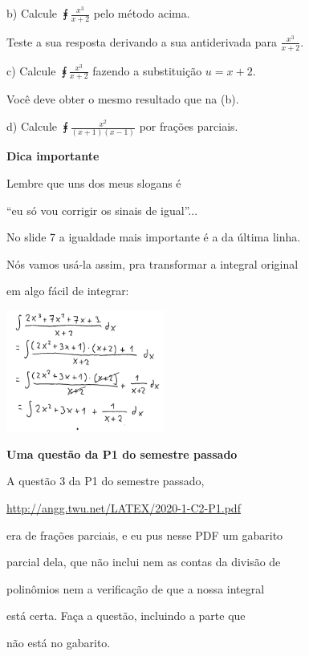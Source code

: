 \documentclass[oneside,12pt]{article}
\begin{document}
b) Calcule $\intx{\frac{x^3}{x+2}}$ pelo método acima.

Teste a sua resposta derivando a sua antiderivada para $\frac{x^3}{x+2}$.

\ssk

c) Calcule $\intx{\frac{x^3}{x+2}}$ fazendo a substituição $u=x+2$.

Você deve obter o mesmo resultado que na (b).

\bsk

d) Calcule $\intx{\frac{x^2}{(x+1)(x-1)}}$ por frações parciais.


\newpage

{\bf Dica importante}

\ssk

Lembre que uns dos meus slogans é

``eu só vou corrigir os sinais de igual''...

No slide 7 a igualdade mais importante é a da última linha.

Nós vamos usá-la assim, pra transformar a integral original

em algo fácil de integrar:

\msk

\includegraphics[height=4cm]{2020-1-C2/20201119_C2_div_com_resto_4.pdf}


\newpage


{\bf Uma questão da P1 do semestre passado}

A questão 3 da P1 do semestre passado,

\ssk

\url{http://angg.twu.net/LATEX/2020-1-C2-P1.pdf}

\ssk

era de frações parciais, e eu pus nesse PDF um gabarito

parcial dela, que não inclui nem as contas da divisão de

polinômios nem a verificação de que a nossa integral

está certa. Faça a questão, incluindo a parte que

não está no gabarito.







\end{document}
